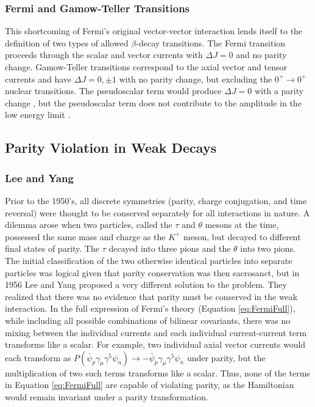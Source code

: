 \subsubsection{Fermi and Gamow-Teller Transitions}

This shortcoming of Fermi's original vector-vector interaction
lends itself to the definition of
two types of allowed $\beta$-decay transitions. The Fermi transition proceeds through the
scalar and vector currents with $\Delta J=0$ and no parity change. Gamow-Teller transitions
correspond to the axial vector and tensor currents and have $\Delta J=0,\pm1$ with no parity change,
but excluding the $0^+\rightarrow 0^+$ nuclear transitions. The pseudoscalar term would produce
$\Delta J=0$ with a parity change \cite{mpmThesis}, but the pseudoscalar term does not
contribute to the amplitude in the low energy limit \cite{renton1990}.
 

\subsection{Parity Violation in Weak Decays}

\subsubsection{Lee and Yang}

Prior to the 1950's, all discrete symmetries (parity, charge conjugation, and time reversal)
were thought to be conserved separately for all interactions in nature. A dilemma arose when
two particles, called the $\tau$ and $\theta$ mesons at the time, possessed the same mass
and charge as the $K^+$ meson, but decayed to different final states of parity. The $\tau$ decayed into three pions
and the $\theta$ into two pions. The initial classification of the two otherwise identical particles into
separate particles was logical given that parity conservation was then sacrosanct,
but in 1956 Lee and Yang proposed a very different solution to the problem. They realized that
there was no evidence that parity must be conserved in the weak interaction.
In the full expression of Fermi's theory (Equation \ref{eq:FermiFull}),
while including all possible combinations of bilinear covariants, there was no mixing between the
individual currents and each individual current-current term transforms like a scalar. For example,
two individual axial vector currents would each transform as
$P(\bar{\psi}_p \gamma_\mu \gamma^5 \psi_n) \rightarrow -\bar{\psi}_p \gamma_\mu \gamma^5 \psi_n$ under parity, but the
multiplication of two such terms transforms like a scalar. Thus, none of the terms in Equation \ref{eq:FermiFull}
are capable of violating parity, as the Hamiltonian would remain invariant under a parity transformation. 


